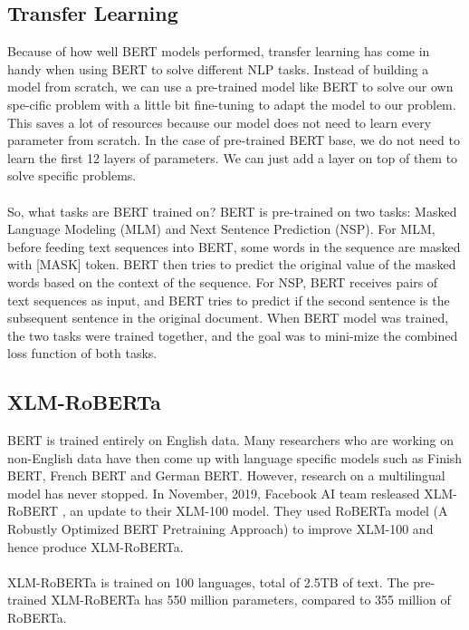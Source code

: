 \documentclass[11pt,a4paper]{article}
\begin{document}
\subsection{Transfer Learning}

Because of how well BERT models performed, transfer learning has come in handy when using BERT to solve different NLP tasks. Instead of building a model from scratch, we can use a pre-trained model like BERT to solve our own spe-cific problem with a little bit fine-tuning to adapt the model to our problem. This saves a lot of resources because our model does not need to learn every parameter from scratch. In the case of pre-trained BERT base, we do not need to learn the first 12 layers of parameters. We can just add a layer on top of them to solve specific problems. \\
\\
So, what tasks are BERT trained on? BERT is pre-trained on two tasks: Masked Language Modeling (MLM) and Next Sentence Prediction (NSP).
For MLM, before feeding text sequences into BERT, some words in the sequence are masked with [MASK] token. BERT then tries to predict the original value of the masked words based on the context of the sequence.
For NSP, BERT receives pairs of text sequences as input, and BERT tries to predict if the second sentence is the subsequent sentence in the original document.
When BERT model was trained, the two tasks were trained together, and the goal was to mini-mize the combined loss function of both tasks.\\


\subsection{XLM-RoBERTa}

BERT is trained entirely on English data. Many researchers who are working on non-English data have then come up with language specific models such as Finish BERT, French BERT and German BERT. However, research on a multilingual model has never stopped. In November, 2019, Facebook AI team resleased XLM-RoBERT \cite{xlm-roberta}, an update to their XLM-100 model. They used RoBERTa \cite{roberta} model (A Robustly Optimized BERT Pretraining Approach) to improve XLM-100 and hence produce XLM-RoBERTa.\\
\\
XLM-RoBERTa is trained on 100 languages, total of 2.5TB of text. The pre-trained XLM-RoBERTa has 550 million parameters, compared to 355 million of RoBERTa.\\
\end{document}
